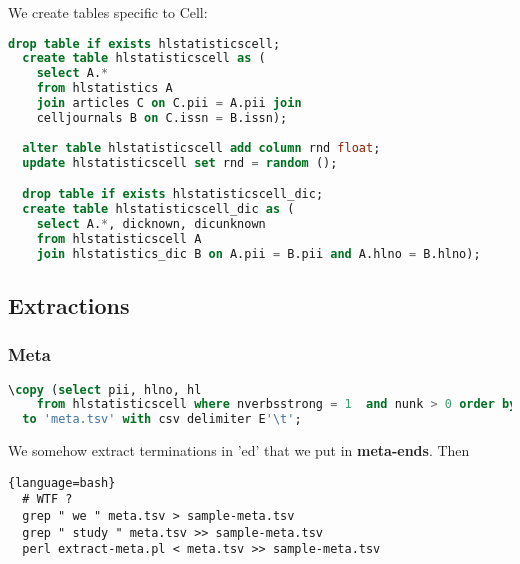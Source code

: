 \documentclass[a4paper,11pt]{report}
\newcommand{\cs}[1]{{\bfseries \ttfamily #1}}
\begin{document}
We create tables specific to Cell:
\begin{lstlisting}[language=SQL]
  drop table if exists hlstatisticscell;
  create table hlstatisticscell as (
    select A.*
    from hlstatistics A
    join articles C on C.pii = A.pii join
    celljournals B on C.issn = B.issn);
    
  alter table hlstatisticscell add column rnd float;
  update hlstatisticscell set rnd = random ();

  drop table if exists hlstatisticscell_dic;
  create table hlstatisticscell_dic as (
    select A.*, dicknown, dicunknown
    from hlstatisticscell A
    join hlstatistics_dic B on A.pii = B.pii and A.hlno = B.hlno);
\end{lstlisting}
\subsection*{Extractions}
\subsubsection*{Meta}
\begin{lstlisting}[language=SQL]
  \copy (select pii, hlno, hl
    from hlstatisticscell where nverbsstrong = 1  and nunk > 0 order by rnd)
  to 'meta.tsv' with csv delimiter E'\t';
\end{lstlisting}
We somehow extract terminations in 'ed' that we put in \cs{meta-ends}. Then
\begin{lstlisting}{language=bash}
  # WTF ?
  grep " we " meta.tsv > sample-meta.tsv
  grep " study " meta.tsv >> sample-meta.tsv
  perl extract-meta.pl < meta.tsv >> sample-meta.tsv
\end{lstlisting}
\end{document}
